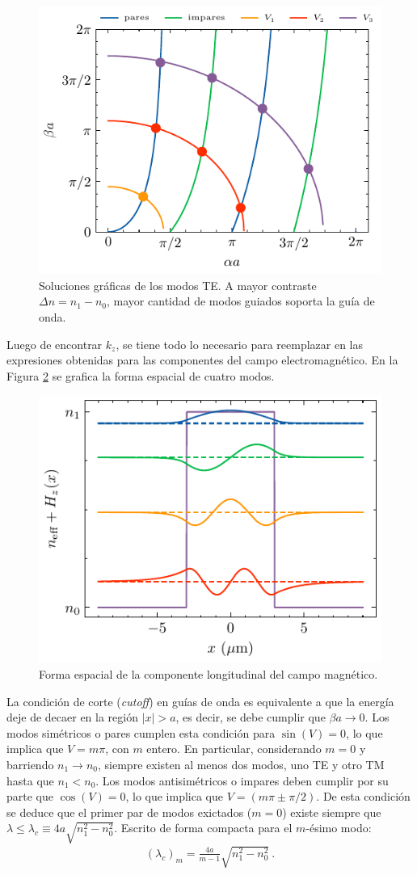 \begin{figure}[H]
	\centering
	\includegraphics[width=0.7\linewidth]{media/slabgraphical.pdf}
	\caption[Soluciones gráficas de los modos TE.]{Soluciones gráficas de los modos TE. A mayor contraste $\Delta n = n_1-n_0$, mayor cantidad de modos guiados soporta la guía de onda. \label{fig:graphTE}}
\end{figure}
Luego de encontrar $k_z$, se tiene todo lo necesario para reemplazar en las expresiones obtenidas para las componentes del campo electromagnético. En la Figura \ref{fig:E-slab-graph} se grafica la forma espacial de cuatro modos.
\begin{figure}[H]
	\centering
	\includegraphics[width=0.7\linewidth]{media/TETMfields.pdf}
	\caption[Forma espacial de la componente longitudinal del campo magnético.]{ Forma espacial de la componente longitudinal del campo magnético. \label{fig:E-slab-graph}}
\end{figure}

La condición de corte (\textit{cutoff}) en guías de onda es equivalente a que la energía deje de decaer en la región $|x| > a$, es decir, se debe cumplir que $\beta a \to 0$. 
Los modos simétricos o pares cumplen esta condición para $\sin(V) = 0$, lo que implica que $V = m \pi$, con $m$ entero. En particular, considerando $m=0$  y barriendo $n_1 \to n_0$, siempre existen al menos dos modos, uno TE y otro TM hasta que $n_1 < n_0$.  
Los modos antisimétricos o impares deben cumplir por su parte que $\cos(V) = 0$, lo que implica que $V = (m\pi \pm \pi/2)$. De esta condición se deduce que el primer par de modos exictados ($m=0$) existe siempre que $\lambda \le \lambda_c \equiv 4a\sqrt{n_1^2-n_0^2}$. Escrito de forma compacta para el $m$-ésimo modo:
\begin{align*}
	 (\lambda_c)_m = \frac{4a}{m-1}  \sqrt{n_1^2-n_0^2} \ .
\end{align*}

